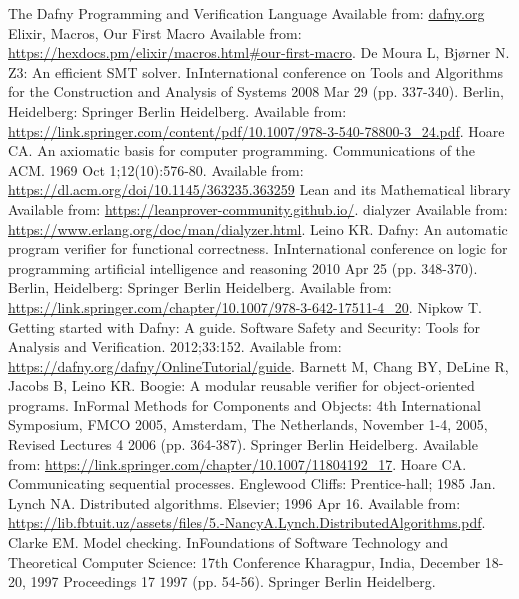 \begin{thebibliography}{9}
The Dafny Programming and Verification Language
Available from: \url{dafny.org}
Elixir, Macros, Our First Macro
Available from: \url{https://hexdocs.pm/elixir/macros.html#our-first-macro}.
De Moura L, Bjørner N. Z3: An efficient SMT solver. InInternational conference on Tools and Algorithms for the Construction and Analysis of Systems 2008 Mar 29 (pp. 337-340). Berlin, Heidelberg: Springer Berlin Heidelberg.
Available from: \url{https://link.springer.com/content/pdf/10.1007/978-3-540-78800-3_24.pdf}.
Hoare CA. An axiomatic basis for computer programming. Communications of the ACM. 1969 Oct 1;12(10):576-80.
Available from: \url{https://dl.acm.org/doi/10.1145/363235.363259}
Lean and its Mathematical library
Available from: \url{https://leanprover-community.github.io/}.
dialyzer
Available from: \url{https://www.erlang.org/doc/man/dialyzer.html}.
Leino KR. Dafny: An automatic program verifier for functional correctness. InInternational conference on logic for programming artificial intelligence and reasoning 2010 Apr 25 (pp. 348-370). Berlin, Heidelberg: Springer Berlin Heidelberg.
Available from: \url{https://link.springer.com/chapter/10.1007/978-3-642-17511-4_20}.
Nipkow T. Getting started with Dafny: A guide. Software Safety and Security: Tools for Analysis and Verification. 2012;33:152.
Available from: \url{https://dafny.org/dafny/OnlineTutorial/guide}.
Barnett M, Chang BY, DeLine R, Jacobs B, Leino KR. Boogie: A modular reusable verifier for object-oriented programs. InFormal Methods for Components and Objects: 4th International Symposium, FMCO 2005, Amsterdam, The Netherlands, November 1-4, 2005, Revised Lectures 4 2006 (pp. 364-387). Springer Berlin Heidelberg.
Available from: \url{https://link.springer.com/chapter/10.1007/11804192_17}.
Hoare CA. Communicating sequential processes. Englewood Cliffs: Prentice-hall; 1985 Jan.
Lynch NA. Distributed algorithms. Elsevier; 1996 Apr 16.
Available from: \url{https://lib.fbtuit.uz/assets/files/5.-NancyA.Lynch.DistributedAlgorithms.pdf}.
Clarke EM. Model checking. InFoundations of Software Technology and Theoretical Computer Science: 17th Conference Kharagpur, India, December 18-20, 1997 Proceedings 17 1997 (pp. 54-56). Springer Berlin Heidelberg.
\end{thebibliography}